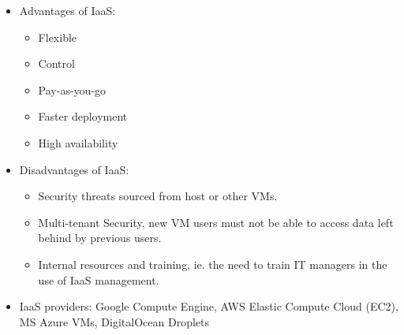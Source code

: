 \documentclass{article}
\begin{document}
\begin{itemize}
    \item Advantages of IaaS:
    \begin{itemize}
        \item Flexible
        
        \item Control
        
        \item Pay-as-you-go
        
        \item Faster deployment
        
        \item High availability
    \end{itemize}
    
    \item Disadvantages of IaaS:
    \begin{itemize}
        \item Security threats sourced from host or other VMs. 
        
        \item Multi-tenant Security, new VM users must not be able to access data left behind by previous users.
        
        \item Internal resources and training, ie. the need to train IT managers in the use of IaaS management.
    \end{itemize}
    
    \item IaaS providers: Google Compute Engine, AWS Elastic Compute Cloud (EC2), MS Azure VMs, DigitalOcean Droplets
\end{itemize}
\end{document}
